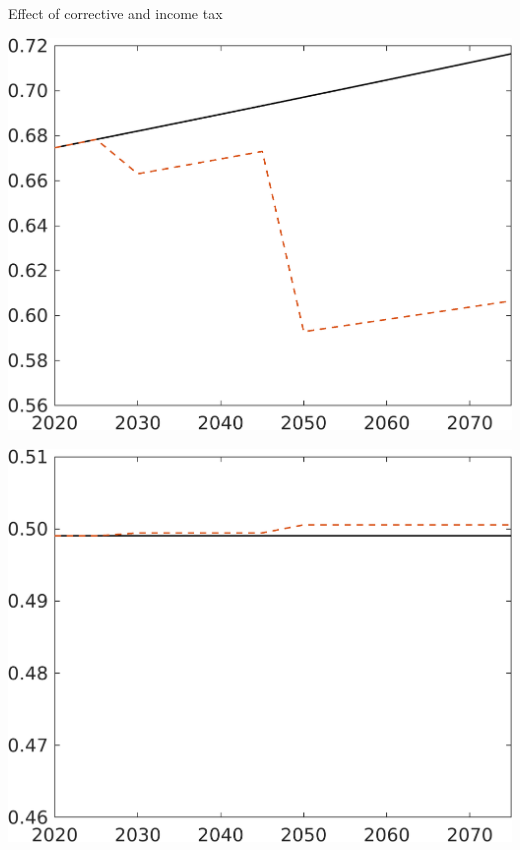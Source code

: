 \documentclass[11pt,aspectratio=169]{beamer}
\begin{document}
\begin{frame}{Effect of corrective and income tax}
	\centering
	\begin{minipage}[]{0.3\textwidth}
		\includegraphics[width=1\textwidth]{../codding_model/own_basedOnFried/optimalPol_elastS_DisuSci/figures/all_1705/CompCounterFac_withLF_noopt_taufopt1_taulopt0_C_spillover0_noskill0_sep1_BN0_ineq0_red0_xgrowth0_etaa0.79_lgd0.png}
	\end{minipage}
	\begin{minipage}[]{0.3\textwidth}
		\includegraphics[width=1\textwidth]{../codding_model/own_basedOnFried/optimalPol_elastS_DisuSci/figures/all_1705/CompCounterFac_withLF_noopt_taufopt1_taulopt0_hh_spillover0_noskill0_sep1_BN0_ineq0_red0_xgrowth0_etaa0.79_lgd0.png}

\end{minipage}
\end{frame}
\end{document}
